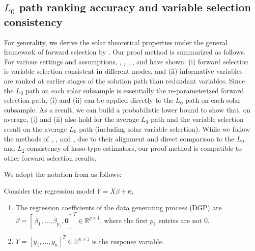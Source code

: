 \documentclass[11pt,review,authoryear]{elsarticle}
\begin{document}
\clearpage
\begin{appendices}
\section{$L_0$ path ranking accuracy and variable selection consistency}

For generality, we derive the solar theoretical properties under the general framework of forward selection by \citet{zhang09}. Our proof method is summarized as follows. For various settings and assumptions, \citet{tropp2004greed}, \citet{yuan2007non}, \citet{wainwright2009sharp}, \citet{zhang09}, and \citet{ing2011stepwise} have shown: (i) forward selection is variable selection consistent in different modes, and (ii) informative variables are ranked at earlier stages of the solution path than redundant variables. Since the $L_0$ path on each solar subsample is essentially the re-parameterized forward selection path, (i) and (ii) can be applied directly to the $L_0$ path on each solar subsample. As a result, we can build a probabilistic lower bound to show that, on average, (i) and (ii) also hold for the average $L_0$ path and the variable selection result on the average $L_0$ path (including solar variable selection). While we follow the methods of \citet{tropp2004greed}, \citet{wainwright2009sharp}, and \citet{zhang09}, due to their alignment and direct comparison to the $L_0$ and $L_2$ consistency of lasso-type estimators, our proof method is compatible to other forward selection results.

We adopt the notation from \citet{zhang09} as follows:

\begin{definition}
  Consider the regression model $Y = X\beta + \mathbf{e}$, \label{def:notation}
\end{definition}
%
\begin{enumerate}
  \item     The regression coefficients of the data generating process (DGP) are $\overline{\beta} = \left[\,\overline{\beta}_1, \ldots, \overline{\beta}_{p_1}, \mathbf{0} \right]^T \in \mathbb{R}^{p\times 1}$, where the first $p_1$ entries are not $0$.
  \item     $Y = \left[ y_1, \ldots, y_n \right]^T \in \mathbb{R}^{n \times 1}$ is the response variable. 
  

\end{enumerate}
\end{appendices}
\end{document}
